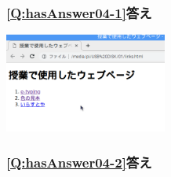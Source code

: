 \documentclass[a4paper,12pt]{jarticle}
\begin{document}
\flushleft
\clearpage
\begin{minipage}{\textwidth}
  \subsubsection{\bfseries
  \ref*{Q:hasAnswer04-1}答え}

  \centering
  \includegraphics[width=0.4\textwidth]{textbook-img224.png}
  \flushleft

  \subsubsection{\bfseries
  \ref*{Q:hasAnswer04-2}答え}


\end{minipage}
\end{document}
